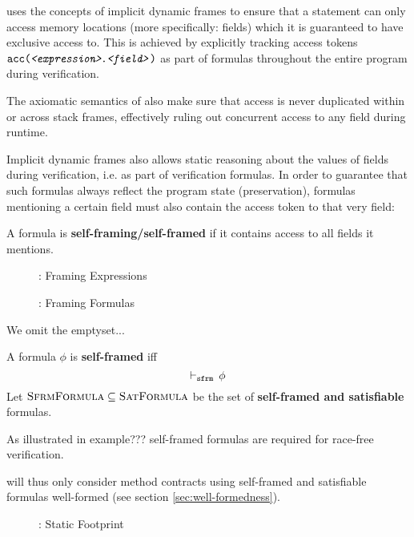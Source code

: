 

\svl uses the concepts of implicit dynamic frames to ensure that a statement can only access memory locations (more specifically: fields) which it is guaranteed to have exclusive access to.
This is achieved by explicitly tracking access tokens $\texttt{acc(\textit{<expression>}.\textit{<field>})}$ as part of formulas throughout the entire program during verification.
    
The axiomatic semantics of \svl also make sure that access is never duplicated within or across stack frames, effectively ruling out concurrent access to any field during runtime.

Implicit dynamic frames also allows static reasoning about the values of fields during verification, i.e. as part of verification formulas.
In order to guarantee that such formulas always reflect the program state (preservation), formulas mentioning a certain field must also contain the access token to that very field:
\begin{definition}
    A formula is \textbf{self-framing/self-framed} if it contains access to all fields it mentions.
\end{definition}


\begin{figure}
    
    \caption{\svl: Framing Expressions}
\end{figure}

\begin{figure}
    
    \caption{\svl: Framing Formulas}
\end{figure}

We omit the emptyset... 

\begin{definition}
    A formula $\phi$ is \textbf{self-framed} iff
    \begin{displaymath}
    \vdash_\texttt{sfrm}\, \phi
    \end{displaymath}
    Let $\textsc{SfrmFormula} \subseteq \textsc{SatFormula}$ be the set of \textbf{self-framed and satisfiable} formulas.
\end{definition}

As illustrated in example??? self-framed formulas are required for race-free verification.

\svl will thus only consider method contracts using self-framed and satisfiable formulas well-formed (see section \ref{sec:well-formedness}).

\begin{figure}
    
    \caption{\svl: Static Footprint}
\end{figure}

